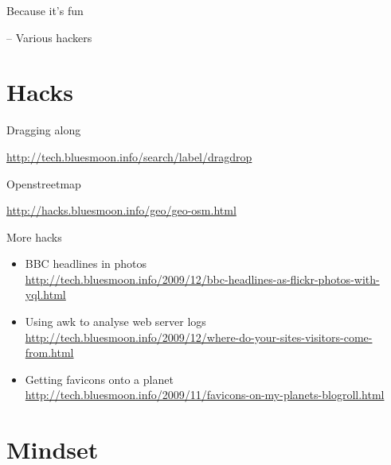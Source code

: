 \documentclass{beamer}
\begin{document}
\begin{frame}{}
\begin{center}Because it's fun\end{center}

\hfill \tiny{-- Various hackers}
\end{frame}


\section{Hacks}

\begin{frame}{Dragging along}
\begin{center}
\href{http://tech.bluesmoon.info/search/label/dragdrop}{http://tech.bluesmoon.info/search/label/dragdrop}
\end{center}
\end{frame}

\begin{frame}{Openstreetmap}
\begin{center}
\href{http://hacks.bluesmoon.info/geo/geo-osm.html}{http://hacks.bluesmoon.info/geo/geo-osm.html}
\end{center}
\end{frame}


\begin{frame}{More hacks}
\begin{itemize}
\item BBC headlines in photos \\ \href{http://tech.bluesmoon.info/2009/12/bbc-headlines-as-flickr-photos-with-yql.html}{\tiny{http://tech.bluesmoon.info/2009/12/bbc-headlines-as-flickr-photos-with-yql.html}}
\item<2-> Using awk to analyse web server logs \\ \href{http://tech.bluesmoon.info/2009/12/where-do-your-sites-visitors-come-from.html}{\tiny{http://tech.bluesmoon.info/2009/12/where-do-your-sites-visitors-come-from.html}}
\item<3-> Getting favicons onto a planet \\ \href{http://tech.bluesmoon.info/2009/11/favicons-on-my-planets-blogroll.html}{\tiny{http://tech.bluesmoon.info/2009/11/favicons-on-my-planets-blogroll.html}}
\end{itemize}
\end{frame}

\section{Mindset}
\end{document}
